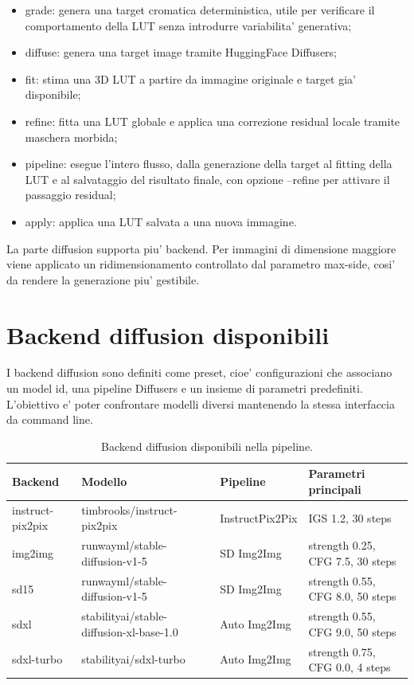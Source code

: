 \documentclass[12pt,a4paper]{report}
\renewcommand{\texttt}[1]{{\normalfont #1}}
\begin{document}
\begin{itemize}
    \item \texttt{grade}: genera una target cromatica deterministica, utile per verificare il comportamento della LUT senza introdurre variabilita' generativa;
    \item \texttt{diffuse}: genera una target image tramite HuggingFace Diffusers;
    \item \texttt{fit}: stima una 3D LUT a partire da immagine originale e target gia' disponibile;
    \item \texttt{refine}: fitta una LUT globale e applica una correzione residual locale tramite maschera morbida;
    \item \texttt{pipeline}: esegue l'intero flusso, dalla generazione della target al fitting della LUT e al salvataggio del risultato finale, con opzione \texttt{--refine} per attivare il passaggio residual;
    \item \texttt{apply}: applica una LUT salvata a una nuova immagine.
\end{itemize}

La parte diffusion supporta piu' backend. Per immagini di dimensione maggiore viene applicato un ridimensionamento controllato dal parametro \texttt{max-side}, cosi' da rendere la generazione piu' gestibile.

\section{Backend diffusion disponibili}

I backend diffusion sono definiti come preset, cioe' configurazioni che associano un model id, una pipeline Diffusers e un insieme di parametri predefiniti. L'obiettivo e' poter confrontare modelli diversi mantenendo la stessa interfaccia da command line.

\begin{table}[htbp]
    \centering
    \small
    \begin{tabular}{p{}p{}p{}p{}}
        \hline
        Backend & Modello & Pipeline & Parametri principali \\
        \hline
        \texttt{instruct-pix2pix} & \texttt{timbrooks/instruct-pix2pix} & InstructPix2Pix & IGS 1.2, 30 steps \\
        \texttt{img2img} & \texttt{runwayml/stable-diffusion-v1-5} & SD Img2Img & strength 0.25, CFG 7.5, 30 steps \\
        \texttt{sd15} & \texttt{runwayml/stable-diffusion-v1-5} & SD Img2Img & strength 0.55, CFG 8.0, 50 steps \\
        \texttt{sdxl} & \texttt{stabilityai/stable-diffusion-xl-base-1.0} & Auto Img2Img & strength 0.55, CFG 9.0, 50 steps \\
        \texttt{sdxl-turbo} & \texttt{stabilityai/sdxl-turbo} & Auto Img2Img & strength 0.75, CFG 0.0, 4 steps \\
        \hline
    \end{tabular}
    \caption{Backend diffusion disponibili nella pipeline.}
    \label{tab:backend-diffusion}
\end{table}
\end{document}
